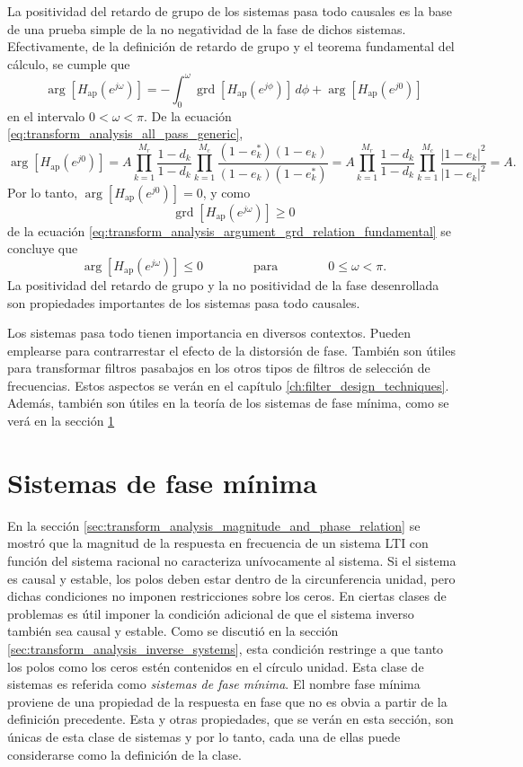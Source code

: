 \documentclass[a4paper]{report}
\DeclareMathOperator{\grd}{grd}
\begin{document}
La positividad del retardo de grupo de los sistemas pasa todo causales es la base de una prueba simple de la no negatividad de la fase de dichos sistemas. Efectivamente, de la definición de retardo de grupo y el teorema fundamental del cálculo, se cumple que 
\begin{equation}\label{eq:transform_analysis_argument_grd_relation_fundamental}
 \arg[H_\textrm{ap}(e^{j\omega})]=-\int_0^\omega\grd[H_\textrm{ap}(e^{j\phi})]\,d\phi+\arg[H_\textrm{ap}(e^{j0})] 
\end{equation}
en el intervalo \(0<\omega<\pi\). De la ecuación \ref{eq:transform_analysis_all_pass_generic},
\[
 \arg[H_\textrm{ap}(e^{j0})]=A\prod_{k=1}^{M_r}\frac{1-d_k}{1-d_k}\prod_{k=1}^{M_c}\frac{(1-e_k^*)(1-e_k)}{(1-e_k)(1-e^*_k)}=A\prod_{k=1}^{M_r}\frac{1-d_k}{1-d_k}\prod_{k=1}^{M_c}\frac{|1-e_k|^2}{|1-e_k|^2}=A.
\]
Por lo tanto, \(\arg[H_\textrm{ap}(e^{j0})]=0\), y como
\[
 \grd[H_\textrm{ap}(e^{j\omega})]\geq0
\]
de la ecuación \ref{eq:transform_analysis_argument_grd_relation_fundamental} se concluye que 
\[
 \arg[H_\textrm{ap}(e^{j\omega})]\leq0
 \qquad\qquad\textrm{para}\qquad\qquad
 0\leq\omega<\pi.
\]
La positividad del retardo de grupo y la no positividad de la fase desenrollada son propiedades importantes de los sistemas pasa todo causales.

Los sistemas pasa todo tienen importancia en diversos contextos. Pueden emplearse para contrarrestar el efecto de la distorsión de fase. También son útiles para transformar filtros pasabajos en los otros tipos de filtros de selección de frecuencias. Estos aspectos se verán en el capítulo \ref{ch:filter_design_techniques}. Además, también son útiles en la teoría de los sistemas de fase mínima, como se verá en la sección \ref{sec:transform_analysis_minimum_phase_systems}

\section{Sistemas de fase mínima}\label{sec:transform_analysis_minimum_phase_systems}

En la sección \ref{sec:transform_analysis_magnitude_and_phase_relation} se mostró que la magnitud de la respuesta en frecuencia de un sistema LTI con función del sistema racional no caracteriza unívocamente al sistema. Si el sistema es causal y estable, los polos deben estar dentro de la circunferencia unidad, pero dichas condiciones no imponen restricciones sobre los ceros. En ciertas clases de problemas es útil imponer la condición adicional de que el sistema inverso también sea causal y estable. Como se discutió en la sección \ref{sec:transform_analysis_inverse_systems}, esta condición restringe a que tanto los polos como los ceros estén contenidos en el círculo unidad. Esta clase de sistemas es referida como \emph{sistemas de fase mínima}. El nombre fase mínima proviene de una propiedad de la respuesta en fase que no es obvia a partir de la definición precedente. Esta y otras propiedades, que se verán en esta sección, son únicas de esta clase de sistemas y por lo tanto, cada una de ellas puede considerarse como la definición de la clase.
\end{document}
